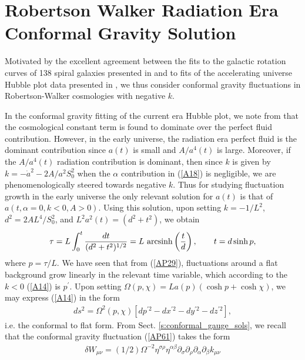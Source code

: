 \section{Robertson Walker Radiation Era Conformal Gravity Solution}
\label{s:rw_radiation_conformal_gravity_sol}

Motivated by the excellent agreement between the fits to the galactic rotation curves of 138 spiral galaxies presented in \cite{mannheim_2011,mannheim_2012, obrien_mannheim_2012} and to fits of the accelerating universe Hubble plot data presented in \cite{mannheim_2006,mannheim_2017}, we thus consider conformal gravity fluctuations in Robertson-Walker cosmologies with negative $k$.

In the conformal gravity fitting of the current era Hubble plot, we note from \cite{mannheim_1990} that the cosmological constant term is found to dominate over the perfect fluid contribution. However, in the early universe, the radiation era perfect fluid is the dominant contribution since $a(t)$ is small and $A/a^4(t)$ is large. Moreover, if the $A/a^4(t)$ radiation contribution is dominant, then since $k$ is given by $k=-\dot{a}^2-2A/a^2S_0^2$ when the $\alpha$ contribution in (\ref{A18}) is negligible, we are phenomenologically steered towards negative $k$. Thus for studying fluctuation growth in the early universe the only relevant solution for $a(t)$ is that of $a(t,\alpha=0,k<0,A>0)$. Using this solution, upon setting $k=-1/L^2$, $d^2=2AL^4/S_0^2$, and $L^2a^2(t)=(d^2+t^2)$, we obtain
%
\begin{eqnarray}
\tau=L\int_0^t \frac{dt}{(d^2+t^2)^{1/2}}=L~{\rm arc sinh}\left(\frac{t}{d}\right),\qquad t=d\sinh p,
\label{B1}
\end{eqnarray}
%
where $p=\tau/L$. We have seen that from (\ref{AP29}), fluctuations around a flat background grow linearly in the relevant time variable, which according to the $k<0$ (\ref{A14}) is $p^{\prime}$. Upon setting $\Omega(p,\chi)=La(p)(\cosh p+\cosh \chi)$, we may express (\ref{A14}) in the form
%
\begin{eqnarray}
ds^2=\Omega^2(p,\chi)\left[dp^{\prime 2}-dx^{\prime 2} -dy^{\prime 2} -dz^{\prime 2}\right],
\label{B2}
\end{eqnarray}
%
i.e. the conformal to flat form. From Sect. \ref{s:conformal_gauge_sols}, we recall that the conformal gravity fluctuation (\ref{AP61}) takes the form
%
\begin{eqnarray}
\delta W_{\mu\nu}=(1/2)\Omega^{-2}\eta^{\sigma\rho}\eta^{\alpha\beta}\partial_{\sigma}\partial_{\rho} \partial_{\alpha}\partial_{\beta}k_{\mu\nu}
\end{eqnarray}
